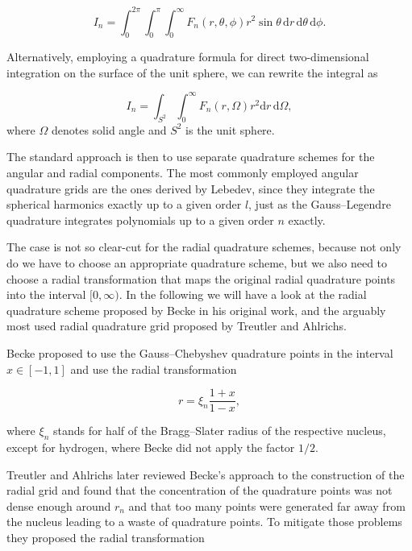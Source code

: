 \documentclass{article}
\begin{document}
\begin{equation}
  I_n = \int_{0}^{2\pi} \int_{0}^{\pi} \int_{0}^\infty
  F_n(r,\theta,\phi)r^2 \sin \theta \,\mathrm dr \, \mathrm d\theta
  \,\mathrm d\phi.
  \label{eq:I_polar}
\end{equation}

Alternatively, employing a quadrature formula for direct
two-dimensional integration on the surface of the unit sphere, we can
rewrite the integral as

\begin{equation}
  I_n = \int_{S^2}\int_0^{\infty} F_n(r,\Omega)r^2  \mathrm dr \,
  \mathrm d\Omega,
  \label{eq:I_solid}
\end{equation}
where $\Omega$ denotes solid angle and $S^2$ is the unit sphere.

The standard approach is then to use separate quadrature schemes for
the angular and radial components. The most commonly employed angular
quadrature grids are the ones derived by Lebedev, since they
integrate the spherical harmonics exactly up to a given order $l$,
just as the Gauss--Legendre quadrature integrates
polynomials up to a given order $n$ exactly.\cite{Lebedev1976, Lebedev1977}

The case is not so clear-cut for the radial quadrature schemes,
because not only do we have to choose an appropriate quadrature
scheme, but we also need to choose a radial transformation that maps
the original radial quadrature points into the interval $[0,\infty)$.
In the following we will have a look at the radial quadrature scheme
proposed by Becke in his original work, and the arguably most used
radial quadrature grid proposed by Treutler and Ahlrichs.
\cite{Becke_1988, Treutler1995}

Becke proposed to use the Gauss--Chebyshev quadrature points in the
interval $x\in [-1,1]$ and use the radial transformation

\begin{equation}
  r = \xi_n\frac{1+x}{1-x},
  \label{eq:Becke_radial}
\end{equation}

where $\xi_n$ stands for half of the Bragg--Slater radius of the
respective nucleus, except for hydrogen, where Becke did not apply
the factor $1/2$.

Treutler and Ahlrichs later reviewed Becke's approach to the
construction of the radial grid and found that the concentration of
the quadrature points was not dense enough around $r_n$ and that too
many points were generated far away from the nucleus leading to a
waste of quadrature points. To mitigate those problems they proposed
the radial transformation
\end{document}
